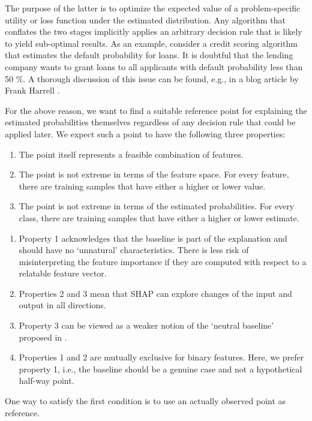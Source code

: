 The purpose of the latter is to optimize the expected value of a problem-specific utility or loss function under the estimated distribution.
Any algorithm that conflates the two stages implicitly applies an arbitrary decision rule that is likely to yield sub-optimal results.
As an example, consider a credit scoring algorithm that estimates the default probability for loans.
It is doubtful that the lending company wants to grant loans to all applicants with default probability less than 50 \%.
A thorough discussion of this issue can be found, e.g., in a blog article by Frank Harrell \cite{Harrell_20}.\par
%
For the above reason, we want to find a suitable reference point for explaining the estimated probabilities themselves regardless of any decision rule that could be applied later.
We expect such a point to have the following three properties:
%
\begin{enumerate}
\item The point itself represents a feasible combination of features.
%
\item The point is not extreme in terms of the feature space.
For every feature, there are training samples that have either a higher or lower value.
%
\item The point is not extreme in terms of the estimated probabilities.
For every class, there are training samples that have either a higher or lower estimate.
\end{enumerate}
%
\begin{remark}
\begin{enumerate}
\item Property 1 acknowledges that the baseline is part of the explanation and should have no `unnatural' characteristics.
There is less risk of misinterpreting the feature importance if they are computed with respect to a relatable feature vector.
%
\item Properties 2 and 3 mean that SHAP can explore changes of the input and output in all directions.
%
\item Property 3 can be viewed as a weaker notion of the `neutral baseline' proposed in \cite{Izzo_20}.
%
\item Properties 1 and 2 are mutually exclusive for binary features.
Here, we prefer property 1, i.e., the baseline should be a genuine case and not a hypothetical half-way point.
\end{enumerate}
\end{remark}
%
One way to satisfy the first condition is to use an actually observed point as reference.
